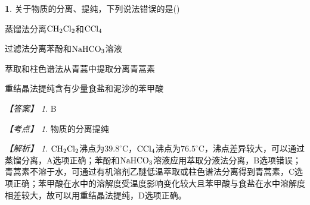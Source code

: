 \documentclass[UTF8, 10pt, a4paper, oneside]{ctexart}
\newcommand{\fs}[1]{{\fangsong #1}}%
\theoremstyle{definition}
\newtheorem{subexercise}{}[exercise]%
\theoremstyle{remark}
\newtheorem*{answer}{【答案】}
\newtheorem*{point}{【考点】}      %
\newtheorem*{explanation}{【解析】}     %
\theoremstyle{plain}
\begin{document}
\begin{subexercise}
    \fs{[2024·湖北卷]}关于物质的分离、提纯，下列说法错误的是\quad(\quad)
    \begin{adjustwidth}{4em}{}
        \begin{asparaenum}[A. ]
            \item 蒸馏法分离$\ce{CH2Cl2}$和$\ce{CCl4}$
            \item 过滤法分离苯酚和$\ce{NaHCO3}$溶液
            \item 萃取和柱色谱法从青蒿中提取分离青蒿素
            \item 重结晶法提纯含有少量食盐和泥沙的苯甲酸
        \end{asparaenum}
    \end{adjustwidth}
    \begin{answer}
        B
    \end{answer}
    \begin{point}
        物质的分离提纯
    \end{point}
    \begin{explanation}
        $\ce{CH2Cl2}$沸点为$39.8^\circ$C，$\ce{CCl4}$沸点为$76.5^\circ$C，沸点差异较大，可以通过蒸馏分离，A选项正确；苯酚和$\ce{NaHCO3}$溶液应用萃取分液法分离，B选项错误；青蒿素不溶于水，可通过有机溶剂乙醚低温萃取或柱色谱法分离得到青蒿素，C选项正确；苯甲酸在水中的溶解度受温度影响变化较大且苯甲酸与食盐在水中溶解度相差较大，故可以用重结晶法提纯，D选项正确。
    \end{explanation}
\end{subexercise}
\end{document}
